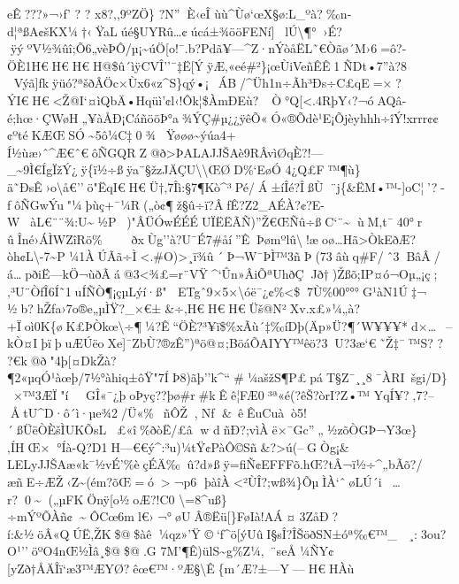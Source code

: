 eÊ???»¬›ƒ'  ?  ?  x8?‚,9ºZÖ\} ?N''È‹eÎ
ùù\^{}Ùø`œX§ø:L\_ºà?‰n­d¦ªßA¢šKX¼†‹ŸaL\textbar úé§UYRû\ldots¢úcá±¾ööFENí{]}lÚ\textbackslash¶°›É?ÿýºV½¾ûî;Õ6„vèÞÔ/µ¡\textasciitilde úÖ{[}o!¯.b?Pdã¥---\^{}Z·nÝòåË\textquotesingle L˜€Òãø´M›6=ô?-ÖÈ1H€H€H€H@\$û´ìÿCVÎ''¯‡Ë{[}ÝÿÆ‚«eé\#²\}¡œÙiVeñÊÊ1ÑDt•7''à?8
Výã{]}fkÿüó?ªšðÂÖc×Ùx6«z\^{}S\}qý•¡~ÁB/\^{}Üh1n÷Ãh³Ðs÷C£qE=×?ÝI€H€\textless Ž@I`¤ìQbÄ•Hqüì'¢l‹!Ôk¦\$ÀmÐEù?~Ò°Q{[}\textless.4RþY‹?¬óAQâ­é;hœ·ÇWøH„¥àÅÐ¡Cá ñööÞ°a¾ÝÇ\#µ¿¿ÿêÕ«Ó«®Õdè¹E¡Õjèyhhh÷îÝ!xrrr¢¢¢ºtéKÆŒSÓ\textasciitilde5ô¼C‡0¾Ÿøøø\textasciitilde ýúa4+
Í½ùæ›ˆ\^{}Æ€ˆ€ôÑGQRZ@ð\textgreater ÞALAJJŠAè9RÂvìØqÈ?!---\_\textasciitilde9Ì€ÍgÏžÝ¿ÿ\{ï½÷ßÿa¨§žzJÄÇU\textbackslash\textbackslash ŒØD\%`EøÓ
4¿Q£F™¶ù\}ä˜ÐsÊ›o\textbackslash å€''ö"ËqI€H€Ü† ‚7Îì:§7¶Kò\^{}³Pé/Á±íÎé?ÎßÙ¨j\{\&ËM•™-{]}oC¦'?-fôÑGwÝu"¼þùç+¯¼R(„ò¢¶ž§û÷ï?ÂfÊ?Z2\_AÉÀ?¢?E-
WàL€¨¨¾:U\textasciitilde½P)"ÂÜÓwÉÉÉUÏËËÃÑ)''Ž€ŒÑû÷ßC`¨\textasciitilde{}ùM‚t¯40°r
ûÎné›ÁÌWZîRö\% 
ðxÙg''à?U¯É7\#åí''ÊÞømºlû\textbackslash!æoø\ldots Hã\textgreater Òk\textbar EðÆ?òh¢L\textbackslash-7\textasciitilde P¼1ÀÚÃã÷Ì \textless.\#O)\textgreater¸ï¾û´Þ¬W¯ÞÌ™3ñÞ(73âùq\#F/ˆ3BâÂ/\textbar á\ldotspðiË---kÖ¬ùðÃá@3\textless¾£=r¨VŸ\^{}`Ûn»ÂiÕªUhðÇJð†)Žßõ;IP¤ó¬Oµ„¡ç;‚³U¨ÒfÎ6Í˜1uÍÑÒ¶¡çµLýí·ß"
ETgˆ9×5×\textbackslash óë¯¿¢\%\textless\$7Ù\%00°°°G¹àN1Ú‡¬
½b?hŽƒa›7o®e\textbar„µÌŸ?\_×€±\&÷‚H€H€H€Üš@N²Xv.x£»¼„à?+Ïoì0K\{øK£ÞÒkœ\textbackslash÷¶¼?Ê``ÖÈ?³¥ï\$\%xÃù´‡‰íDþ(Äp»Ü?¶´W¥¥¥*d×\ldots~--kÒ¤IþïþuÆÚëoXe{]}¯ZbÙ?®zÊ'')ªö@¤;BöáÕA IYY™êö?3U?3æ`€˜Ž‡¯ ™S? 
? 
?€k@ð"4þ{[}¤Dk\textbar Žà?¶2«µ\textbar qÓ¹àœþ/7½°àhiq±ôŸ"7Í­Þ8)ãþ''k\^{}``\#¼ašžS¶P£páT§Z¯¸¸8¯ÀRI~šgi/D\}~×™3ÆÏ"íGÎ«¯¿þoÞyç??þø\#r\#kÊê¦FÆ0³ª«é(?êŠ?òrI?Z•™
YqÍ\textless@¥?‚7?-- ÅtU\^{}D·ô´ì·µe¾2/Ü«\%~ñÔŽ,Nƒ
\&~êÊuCuàò5!´ßÜëÒÈšÌ\textbar UKÕsL£«î\%ðòË/£â w
dñ\textquotesingle Ð?;vìÀë×¯Gc''„½zõÒGÞ¬Y3œ\}‚ÍHŒ×°Íà-Q?D1H---€€ ý\^{}:³u)¼tŸ¢PàÔ©Sñ\textquotesingle\&?\textgreater ú(--GÒg¡\&
LELyJJŠAæ«k¯½vÉ'\%èçÉÄ‰û?d»ßÿ=fiÑ¢EFFFõ.hŒ?tÂ¬ï½÷\^{}„bÃõ?/æñE÷ÆŽ‹Z\textasciitilde(ém?õŒ=ó\textgreater\textquotesingle¬p6
þàîÀ\textless²ÙÎ?;wß¾\}ÕµÌÀ`\textquotesingle ˆøLÚ´i\ldots r?0\textasciitilde(„µFKÖnÿ{[}o½oÆ?!C0
\textbackslash=8\^{}uß\}÷mÝºÕÀñ¢\textasciitilde{}ÔCœ6ml€›¬°øUÂ®Ëü{[}\}FøIà!AÁ¤3ZåÐ?í:\&½öÂ«QÚË,ŽK\$@\$àê¼qz»'Ÿ
\textquotesingle©­`f\^{}ö{[}ýUûI\textbar§sÎ?ÎŠöðSN±óª‰€™\_ 
¸:3ou?O¹''öºO4nŒ½Ìâ¸\$@\$@.G
7M'¶Ê)ülS\textasciitilde g\%Z¼‚~¨seÅ¼ÑY¢{[}yZð†ÅÄÎï`æ3™ÆYØ?êœ€™·ºÆ§\textbackslash Ê\{m´Æ?±---Y---H€HÀù

